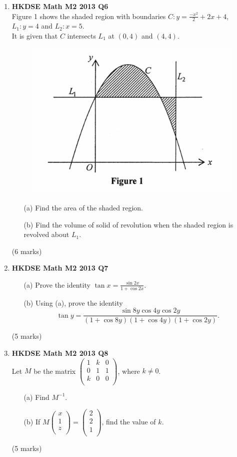 \documentclass{report}
\begin{document}
\begin{enumerate}
	\newpage

	\item \textbf{HKDSE Math M2 2013 Q6}\\
	Figure 1 shows the shaded region with boundaries $C : y = \displaystyle\frac{-x^2}{2} + 2x + 4$, $L_1 : y = 4$ and $L_2 : x = 5$. \\
	It is given that $C$ intersects $L_1$ at $(0,4)$ and $(4,4)$. 
	\begin{figure}[H]
		\centering
		\includegraphics[width = .4\linewidth]{2013Figure1}
	\end{figure}
	\begin{enumerate}
		\item [(a)]Find the area of the shaded region.
		\item [(b)]Find the volume of solid of revolution when the shaded region is revolved about $L_1$.
	\end{enumerate}
	(6 marks)

	\item \textbf{HKDSE Math M2 2013 Q7}
	\begin{enumerate}
		\item [(a)]Prove the identity $\tan{x} = \displaystyle\frac{\sin{2x}}{1+\cos{2x}}$. 
		\item [(b)]Using (a), prove the identity $$\tan{y} = \displaystyle\frac{\sin{8y}\cos{4y}\cos{2y}}{(1+\cos{8y})(1+\cos{4y})(1+\cos{2y})}.$$
	\end{enumerate}
	(5 marks)

	\item \textbf{HKDSE Math M2 2013 Q8}\\
	Let $M$ be the matrix $\begin{pmatrix}
		1 & k & 0\\
		0 & 1 & 1\\
		k & 0 & 0\\
	\end{pmatrix}$, where $k \neq 0$. 
	\begin{enumerate}
		\item [(a)]Find $M^{-1}$. 
		\item [(b)]If $M\begin{pmatrix}
		x\\
		1\\
		z\\
	\end{pmatrix} = \begin{pmatrix}
		2\\
		2\\
		1\\
	\end{pmatrix}$, find the value of $k$.
	\end{enumerate}
	(5 marks)


\end{enumerate}
\end{document}
